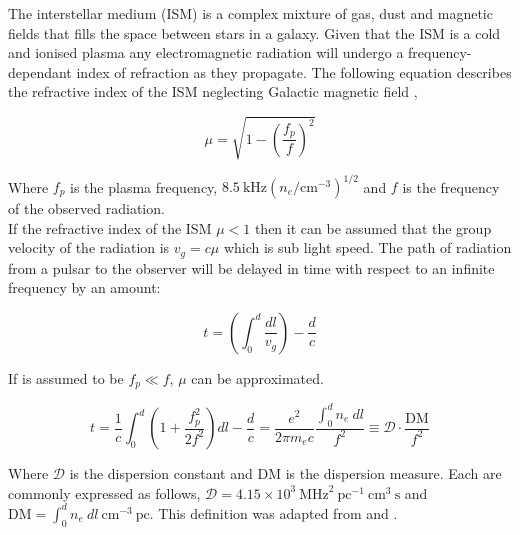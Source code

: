 The interstellar medium (ISM) is a complex mixture of gas, dust and magnetic fields that fills the space between stars in a galaxy. Given that the ISM is a cold and ionised plasma any electromagnetic radiation will undergo a frequency-dependant index of refraction as they propagate. The following equation describes the refractive index of the ISM neglecting Galactic magnetic field \citep[p.~85]{pulsar_handbook},

\begin{equation}
    \mu = \sqrt{1 - \left( \frac{f_p}{f} \right)^2}
    \label{eq: ism-refractive-index}
\end{equation}

Where $f_p$ is the plasma frequency, $8.5 ~\text{kHz} \left(n_e/\text{cm}^{-3} \right)^{1/2}$ and $f$ is the frequency of the observed radiation. \\ If the refractive index of the ISM $\mu < 1$ then it can be assumed that the group velocity of the radiation is $v_g = c\mu$ which is sub light speed. The path of radiation from a pulsar to the observer will be delayed in time with respect to an infinite frequency by an amount:

\begin{equation}
    t = \left( \int^d_0 \frac{dl}{v_g} \right) - \frac{d}{c}
\end{equation}

If is assumed to be $f_p \ll f$, $\mu$ can be approximated.

\begin{equation}
    t = \frac{1}{c} \int^d_0 \left(1 + \frac{f_p^2}{2f^2} \right) dl - \frac{d}{c}  = \frac{e^2}{2 \pi m_e c} \dfrac{\int^d_0 n_e ~dl}{f^2} \equiv \mathcal{D} \cdot \dfrac{\text{DM}}{f^2}
\end{equation}

Where $\mathcal{D}$ is the dispersion constant and $\text{DM}$ is the dispersion measure. Each are commonly expressed as follows, $\mathcal{D}= 4.15 \times 10^3 ~\text{MHz}^2 ~\text{pc}^{-1} ~ \text{cm}^3 ~\text{s}$ and $\text{DM} = \int^d_0 n_e ~dl ~\text{cm}^{-3} ~\text{pc}$. This definition was adapted from \citet[p.~86]{pulsar_handbook} and \cite{taylor_recent_1977}.


